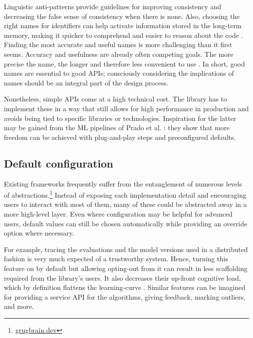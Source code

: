 Linguistic anti-patterns provide guidelines for improving consistency and decreasing the false sense of consistency when there is none. Also, choosing the right names for identifiers can help activate information stored in the long-term memory, making it quicker to comprehend and easier to reason about the code \cite{deissenboeck2006concise}. Finding the most accurate and useful names is more challenging than it first seems. Accuracy and usefulness are already often competing goals. The more precise the name, the longer and therefore less convenient to use \cite{butler2009relating}. In short, good names are essential to good APIs; consciously considering the implications of names should be an integral part of the design process.

Nonetheless, simple APIs come at a high technical cost. The library has to implement these in a way that still allows for high performance in production \cite{kleppmann2017designing} and avoids being tied to specific libraries or technologies. Inspiration for the latter may be gained from the ML pipelines of Prado et al. \cite{prado2020bonseyes}: they show that more freedom can be achieved with plug-and-play steps and preconfigured defaults. 

\subsection{Default configuration}

Existing frameworks frequently suffer from the entanglement of numerous levels of abstractions.\footnote{\href{https://grugbrain.dev/\#grug-on-apis}{grugbrain.dev}} Instead of exposing each implementation detail and encouraging users to interact with most of them, many of these could be abstracted away in a more high-level layer. Even where configuration may be helpful for advanced users, default values can still be chosen automatically while providing an override option where necessary.

For example, tracing the evaluations and the model versions used in a distributed fashion is very much expected of a trustworthy system. Hence, turning this feature on by default but allowing opting-out from it can result in less scaffolding required from the library's users. It also decreases their up-front cognitive load, which by definition flattens the learning-curve \cite{hermans2021programmer}. Similar features can be imagined for providing a service API for the algorithms, giving feedback, marking outliers, and more.

